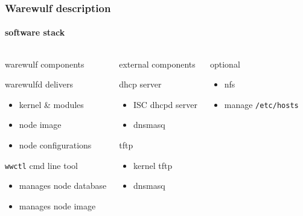 \documentclass[aspectratio=169]{beamer}
\begin{document}
\begin{frame}[fragile]
\frametitle{Warewulf description}
\framesubtitle{software stack}
\begin{columns}
  \begin{block}{warewulf components}
  \hspace*{.1\linewidth}\begin{minipage}{.8\linewidth}
  \begin{block}{warewulfd delivers}
    \begin{itemize}
      \item kernel \& modules
      \item node image
      \item node configurations
    \end{itemize}
  \end{block}
  \begin{block}{\texttt{wwctl} cmd line tool}
    \begin{itemize}
      \item manages node database
      \item manages node image
    \end{itemize}
  \end{block}
  \vspace*{1cm}
  \end{minipage}
  \end{block}
  \begin{block}{external components}
  \hspace*{.1\linewidth}\begin{minipage}{.8\linewidth}
    \begin{block}{dhcp server}
      \begin{itemize}
      \item ISC dhcpd server
      \item dnsmasq
    \end{itemize}
    \end{block}
    \begin{block}{tftp}
      \begin{itemize}
      \item kernel tftp
      \item dnsmasq
    \end{itemize}
    \end{block}
  \end{minipage} 
  \end{block}
  \begin{block}{optional}
    \begin{itemize}
      \item nfs
      \item manage \texttt{/etc/hosts}
    \end{itemize}
  \end{block}
\end{columns}
\end{frame}
\end{document}
